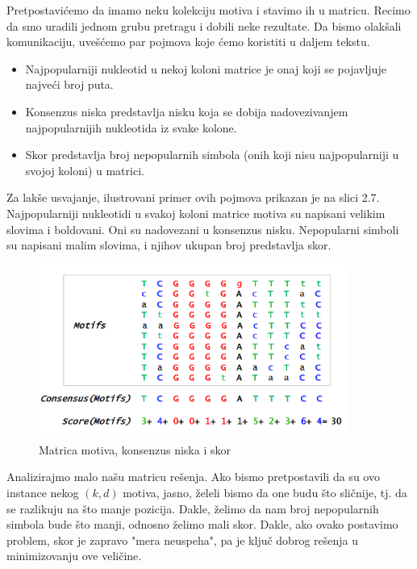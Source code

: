 Pretpostavićemo da imamo neku kolekciju motiva i stavimo ih u matricu. Recimo da smo uradili jednom grubu pretragu i dobili neke rezultate. Da bismo olakšali komunikaciju, uvešćemo par pojmova koje ćemo koristiti u daljem tekstu.

\begin{itemize}
    \item Najpopularniji nukleotid u nekoj koloni matrice je onaj koji se pojavljuje najveći broj puta.
    \item Konsenzus niska predstavlja nisku koja se dobija nadovezivanjem najpopularnijih nukleotida iz svake kolone.
    \item Skor predstavlja broj nepopularnih simbola (onih koji nisu najpopularniji u svojoj koloni) u matrici.
\end{itemize}

Za lakše usvajanje, ilustrovani primer ovih pojmova prikazan je na slici 2.7. Najpopularniji nukleotidi u svakoj koloni matrice motiva su napisani velikim slovima i boldovani. Oni su nadovezani u konsenzus nisku. Nepopularni simboli su napisani malim slovima, i njihov ukupan broj predstavlja skor.

\newpage

\begin{figure}[h]
\caption{Matrica motiva, konsenzus niska i skor}
\centering
\includegraphics[width=0.9\textwidth]{poglavlja/2/slike/30.PNG}
\end{figure}

Analizirajmo malo našu matricu rešenja. Ako bismo pretpostavili da su ovo instance nekog $(k,d)$ motiva, jasno, želeli bismo da one budu što sličnije, tj. da se razlikuju na što manje pozicija. Dakle, želimo da nam broj nepopularnih simbola bude što manji, odnosno želimo mali skor. Dakle, ako ovako postavimo problem, skor je zapravo "mera neuspeha", pa je ključ dobrog rešenja u minimizovanju ove veličine. 

